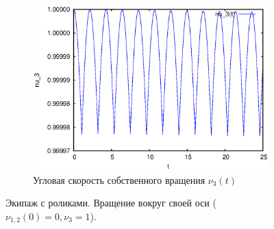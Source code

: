 \begin{figure}[H]
\begin{subfigure}[t]{0.3\textwidth}
        \includegraphics[width=\linewidth]{pic/rol__self_rot__velocity_of_self_rotation}
        \caption{Угловая скорость собственного вращения $\nu_3(t)$}
        \label{fig:rol__self_rot__velocity_of_self_rotation}    
    \end{subfigure}

    \caption{Экипаж с роликами. Вращение вокруг своей оси ($\nu_{1,2}(0) = 0, \nu_3 = 1$).}
    \label{fig:selfrot}
    
\end{figure}
